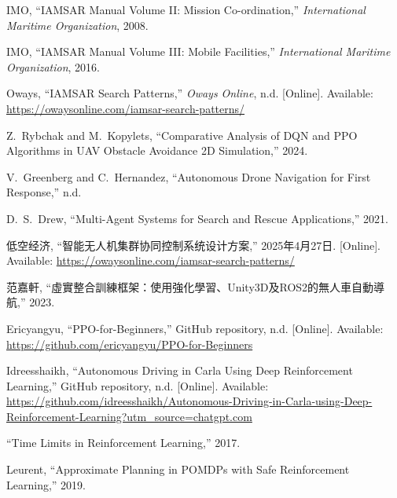 \documentclass[12pt,a4paper]{ctexart}
\begin{document}
\begin{thebibliography}{9}

IMO,
``IAMSAR Manual Volume II: Mission Co-ordination,''
\textit{International Maritime Organization},
2008.

IMO,
``IAMSAR Manual Volume III: Mobile Facilities,''
\textit{International Maritime Organization},
2016.

Oways,
``IAMSAR Search Patterns,''
\textit{Oways Online},
n.d.
[Online]. Available: \url{https://owaysonline.com/iamsar-search-patterns/}

Z.~Rybchak and M.~Kopylets,
``Comparative Analysis of DQN and PPO Algorithms in UAV Obstacle Avoidance 2D Simulation,''
2024.

V.~Greenberg and C.~Hernandez,
``Autonomous Drone Navigation for First Response,''
n.d.

D.~S.~Drew,
``Multi-Agent Systems for Search and Rescue Applications,''
2021.

低空经济,
``智能无人机集群协同控制系统设计方案,''
2025年4月27日.
[Online]. Available: \url{https://owaysonline.com/iamsar-search-patterns/}

范嘉軒,
``虛實整合訓練框架：使用強化學習、Unity3D及ROS2的無人車自動導航,''
2023.

Ericyangyu,
``PPO-for-Beginners,''
GitHub repository,
n.d.
[Online]. Available: \url{https://github.com/ericyangyu/PPO-for-Beginners}


Idreesshaikh,
``Autonomous Driving in Carla Using Deep Reinforcement Learning,''
GitHub repository,
n.d.
[Online]. Available: \url{https://github.com/idreesshaikh/Autonomous-Driving-in-Carla-using-Deep-Reinforcement-Learning?utm\_source=chatgpt.com}


``Time Limits in Reinforcement Learning,''
2017.

Leurent,
``Approximate Planning in POMDPs with Safe Reinforcement Learning,''
2019.

\end{thebibliography}
\end{document}
